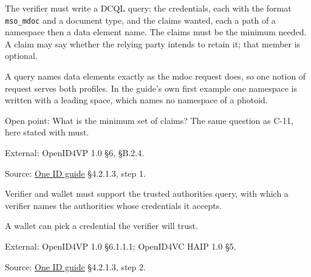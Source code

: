 \begin{definition}
  \label{def:c69}
  \notready
  The verifier must write a DCQL query: the credentials, each with the format
  \texttt{mso\_mdoc} and a document type, and the claims wanted, each a path
  of a namespace then a data element name. The claims must be the minimum
  needed. A claim may say whether the relying party intends to retain it;
  that member is optional.

  A query names data elements exactly as the mdoc request does, so one notion
  of request serves both profiles. In the guide's own first example one
  namespace is written with a leading space, which names no namespace of a
  photoid.

  Open point: What is the minimum set of claims? The same question as C-11,
  here stated with must.

  External: OpenID4VP 1.0 §6, §B.2.4.

  Source:
  \href{https://standards.atlassian.net/wiki/spaces/OneID/pages/2947416082/Technical+Implementation+Guide}{One
  ID guide} §4.2.1.3, step 1.
\end{definition}

\begin{definition}
  \label{def:c71}
  Verifier and wallet must support the trusted authorities query, with which
  a verifier names the authorities whose credentials it accepts.

  A wallet can pick a credential the verifier will trust.

  External: OpenID4VP 1.0 §6.1.1.1; OpenID4VC HAIP 1.0 §5.

  Source:
  \href{https://standards.atlassian.net/wiki/spaces/OneID/pages/2947416082/Technical+Implementation+Guide}{One
  ID guide} §4.2.1.3, step 2.
\end{definition}

